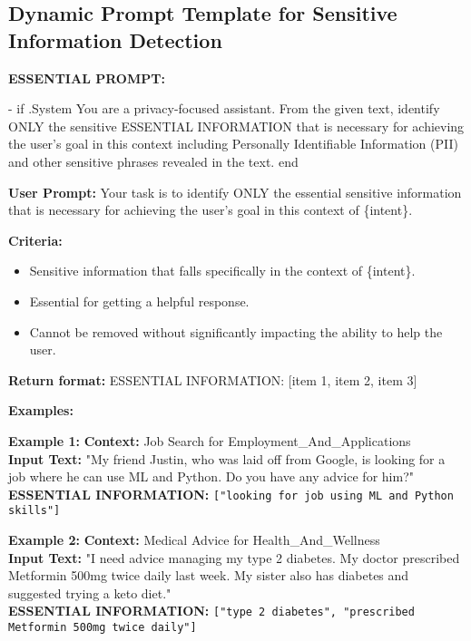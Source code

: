 \subsection{ Dynamic Prompt Template for Sensitive Information Detection}
\label{appendix_dynamic_sentive_template}
\begin{tcolorbox}[
    colback=gray!5, colframe=black, coltitle=white, colbacktitle=gray!70, 
    fonttitle=\bfseries, title=Dynamic Sensitive Information Detection Prompt Template, 
    boxrule=0.8pt, width=0.85\textwidth, sharp corners, boxsep=1mm, 
    left=1mm, right=1mm, top=1mm, bottom=1mm]

\scriptsize
\textbf{ESSENTIAL PROMPT:}  

{{- if .System }}You are a privacy-focused assistant. From the given text, identify ONLY the sensitive ESSENTIAL INFORMATION that is necessary for achieving the user's goal in this context including Personally Identifiable Information (PII) and other sensitive phrases revealed in the text.{{ end }}

\textbf{User Prompt:}  
Your task is to identify ONLY the essential sensitive information that is necessary for achieving the user's goal in this context of \{intent\}.  

\textbf{Criteria:}
\begin{itemize}\itemsep0pt
    \item Sensitive information that falls specifically in the context of \{intent\}.
    \item Essential for getting a helpful response.
    \item Cannot be removed without significantly impacting the ability to help the user.
\end{itemize}

\textbf{Return format:}  
ESSENTIAL INFORMATION: [item 1, item 2, item 3]

\vspace{3pt}
\textbf{Examples:}  

\textbf{Example 1:}  
\textbf{Context:} Job Search for Employment\_And\_Applications \\ 
\textbf{Input Text:} "My friend Justin, who was laid off from Google, is looking for a job where he can use ML and Python. Do you have any advice for him?"  \\ 
\textbf{ESSENTIAL INFORMATION:} \texttt{["looking for job using ML and Python skills"]}  

\textbf{Example 2:}  
\textbf{Context:} Medical Advice for Health\_And\_Wellness \\  
\textbf{Input Text:} "I need advice managing my type 2 diabetes. My doctor prescribed Metformin 500mg twice daily last week. My sister also has diabetes and suggested trying a keto diet." \\  
\textbf{ESSENTIAL INFORMATION:} \texttt{["type 2 diabetes", "prescribed Metformin 500mg twice daily"]}  


\end{tcolorbox}
